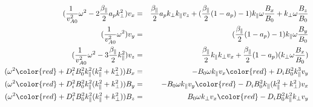 \begin{eqnarray}
( \frac{1 }{v^2_{A0}}\omega^2 - 2\frac{\beta_{\parallel}}{2} a_p k^2_{\perp} ) v_x &=&  \frac{\beta_{\parallel}}{2} a_p k_{\perp}k_{\parallel} v_z  + (\frac{\beta_{\parallel}}{2}  (1 - a_p) -1) k_{\parallel} \omega \frac{B_x}{B_0} +k_{\perp} \omega \frac{B_z}{B_0}  \nonumber \\
 (\frac{1 }{v^2_{A0}} \omega^2) v_y &=&    (\frac{\beta_{\parallel}}{2}  (1 - a_p) -1)k_{\parallel}  \omega \frac{B_y}{B_0}  \nonumber \\
(\frac{1 }{v^2_{A0}} \omega^2 - 3 \frac{\beta_{\parallel}}{2} k^2_{\parallel}) v_z &=&  \frac{\beta_{\parallel}}{2} k_{\parallel} k_{\perp} v_x  + \frac{\beta_{\parallel}}{2}  (1 - a_p) (k_{\perp} \omega \frac{B_x}{B_0} )\nonumber \\ 
(\omega^2  {\color{red} + D^2_i B^2_0 k^2_{\parallel} (k^2_{\parallel} + k^2_{\perp}) } )   B_x &=&  -  B_0  \omega   k_{\parallel} v_x    {\color{red} + D_i B^2_0  k^3_{\parallel} v_y  }  \nonumber\\ 
 (\omega^2  {\color{red} + D^2_i B^2_0 k^2_{\parallel} (k^2_{\parallel} + k^2_{\perp}) } ) B_y &=&   - B_0 \omega k_{\parallel} v_y  {\color{red}  - D_i B^2_0 k_{\parallel} (k^2_{\parallel} + k^2_{\perp}) v_x} \nonumber  \\
 (\omega^2  {\color{red} + D^2_i B^2_0 k^2_{\parallel} (k^2_{\parallel} + k^2_{\perp}) } )  B_z &=&   B_0 \omega    k_{\perp} v_x       {\color{red}  -  D_i B^2_0 k^2_{\parallel}  k_{\perp}   v_y } \nonumber 
\end{eqnarray}

